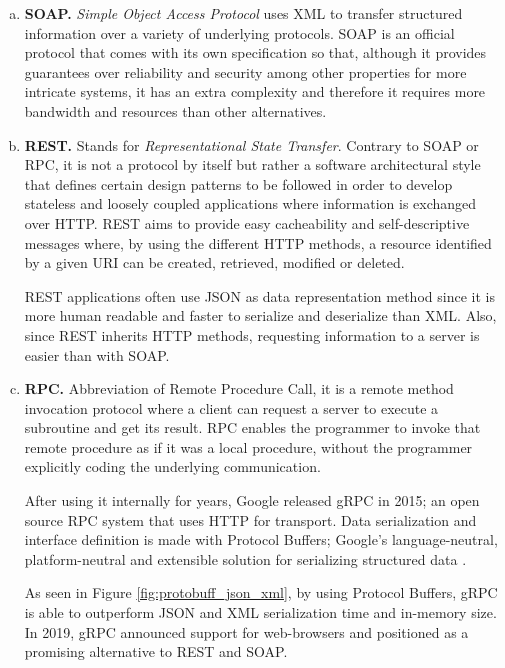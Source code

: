 \begin{enumerate}[a)]
	\item \textbf{SOAP.} \textit{Simple Object Access Protocol} \cite{SOAP} uses XML to transfer structured information over a variety of underlying protocols. SOAP is an official protocol that comes with its own specification so that, although it provides guarantees over reliability and security among other properties for more intricate systems, it has an extra complexity and therefore it requires more bandwidth and resources than other alternatives.

	\item \textbf{REST.} Stands for \textit{Representational State Transfer}. Contrary to SOAP or RPC, it is not a protocol by itself but rather a software architectural style that defines certain design patterns to be followed in order to develop stateless and loosely coupled applications where information is exchanged over HTTP. REST aims to provide easy cacheability and self-descriptive messages where, by using  the different HTTP  methods, a resource identified by a given URI can be created, retrieved, modified or deleted. 
	
	REST applications often use JSON as data representation method since it is more human readable and faster to serialize and deserialize than XML. Also, since REST inherits HTTP methods, requesting information to a server is easier than with SOAP.

	\item \textbf{RPC.} Abbreviation of Remote Procedure Call, it is a remote method invocation protocol where a client can request a server to execute a subroutine and get its result. RPC enables the programmer to invoke that remote procedure as if it was a local procedure, without the programmer explicitly coding the underlying communication.
	
	After using it internally for years, Google released gRPC \cite{grpc} in 2015; an open source RPC system that uses HTTP for transport. Data serialization and interface definition is made with Protocol Buffers; Google's language-neutral, platform-neutral and extensible solution for serializing structured data \cite{protobuf}.
	
	As seen in Figure \ref{fig:protobuff_json_xml}, by using Protocol Buffers, gRPC is able to outperform JSON and XML serialization time and in-memory size. In 2019, gRPC announced support for web-browsers \cite{grpc-web-announce} and positioned as a promising alternative to REST and SOAP. 
	

\end{enumerate}
